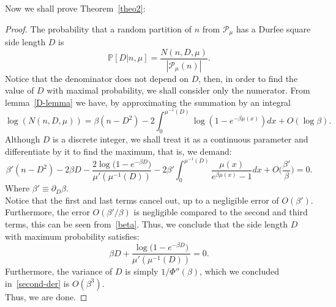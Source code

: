\documentclass[pdflatex,sn-mathphys-num]{sn-jnl}%
\theoremstyle{thmstyleone}%
\theoremstyle{thmstyletwo}%
\theoremstyle{thmstylethree}%
\theoremstyle{thmstylethree}%
\theoremstyle{thmstylethree}%
\begin{document}
Now we shall prove Theorem~\ref{theo2}:
\begin{proof}
    The probability that a random partition of $n$ from $\mathcal{P}_\mu$ has a Durfee square side length $D$ is
\begin{equation*}
    \mathbb{P}[D|n,\mu]=\frac{N(n,D,\mu)}{|\mathcal{P}_\mu(n)|}.
\end{equation*}
Notice that the denominator does not depend on $D$, then, in order to find the value of $D$ with maximal probability, we shall consider only the numerator. From lemma~\ref{D-lemma} we have, by approximating the summation by an integral
\begin{equation}
    \log(N(n,D,\mu))=\beta(n-D^2)-2\int_0^{\mu^{-1}(D)}\log(1-e^{-\beta\mu(x)})dx+O(\log\beta).
\end{equation}
Although $D$ is a discrete integer, we shall treat it as a continuous parameter and differentiate by it to find the maximum, that is, we demand:
\begin{equation*}
    \beta'(n-D^2)-2\beta D-\frac{2\log\big(1-e^{-\beta D}\big)}{\mu'(\mu^{-1}(D))}-2\beta'\int_0^{\mu^{-1}(D)}\frac{\mu(x)}{e^{\beta\mu(x)}-1}dx+O\Big(\frac{\beta'}{\beta}\Big)=0.
\end{equation*}
Where $\beta'\equiv\partial_D\beta$. \\
Notice that the first and last terms cancel out, up to a negligible error of $O(\beta')$. Furthermore, the error $O(\beta'/\beta)$ is negligible compared to the second and third terms, this can be seen from~\eqref{beta}. Thus, we conclude that the side length $D$ with maximum probability satisfies:
\begin{equation*}
    \beta D+\frac{\log\big(1-e^{-\beta D}\big)}{\mu'(\mu^{-1}(D))}=0.
\end{equation*}
Furthermore, the variance of $D$ is simply $1/\Phi''(\beta)$, which we concluded in~\eqref{second-der} is $O(\beta^3)$. \\
Thus, we are done.
\end{proof}

\vspace{0.75cm}
\end{document}
